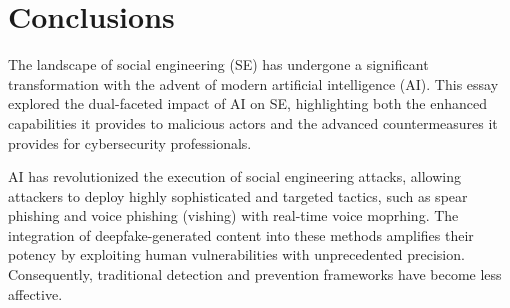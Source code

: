 



\chapter{Conclusions\label{chapter:conclusions}}
\begin{comment}
    
Guides:
    - As many pages as it takes (thesis max is around 20 pages)

TODO:
    [ ] How AI has augmented SE attacks and countermeasures
    [ ] Gap in the literature

What to cover:
    - How AI has augmented SE attacks and countermeasures
    - Gap in the literature regarding SE and AI intersection?
    - Analysis on where AI-powered SE attacks might be headed in the future
        - Also about robotics and human-like actors
    - What organizations and individuals need to do regarding the evolving landscape of SE attacks

Speculation:
    - Drones dropping USB thumbdrives?
    - Human-like android as threat actors
    - Impact of robotics on dumpster diving, shoulder surfing and baiting
    
Literature:
    - Gen and detection of deepfakes

From training material:
    - Yhteenveto vaatimattomimmillaan on vain lyhyt kertaus kirjoituksen keskeisistä asioista. Arvokkaamman yhteenvedon saa aikaan kommentoimalla työn tulosten arvoa, työn liittymistä ympäristöön ja tulevaisuudennäkymiä. Tällaiset arviot huolellisesti perusteltava.

\end{comment}

The landscape of social engineering (SE) has undergone a significant transformation with the advent of modern artificial intelligence (AI). This essay explored the dual-faceted impact of AI on SE, highlighting both the enhanced capabilities it provides to malicious actors and the advanced countermeasures it provides for cybersecurity professionals.

AI has revolutionized the execution of social engineering attacks, allowing attackers to deploy highly sophisticated and targeted tactics, such as spear phishing and voice phishing (vishing) with real-time voice moprhing. The integration of deepfake-generated content into these methods amplifies their potency by exploiting human vulnerabilities with unprecedented precision. Consequently, traditional detection and prevention frameworks have become less affective.

